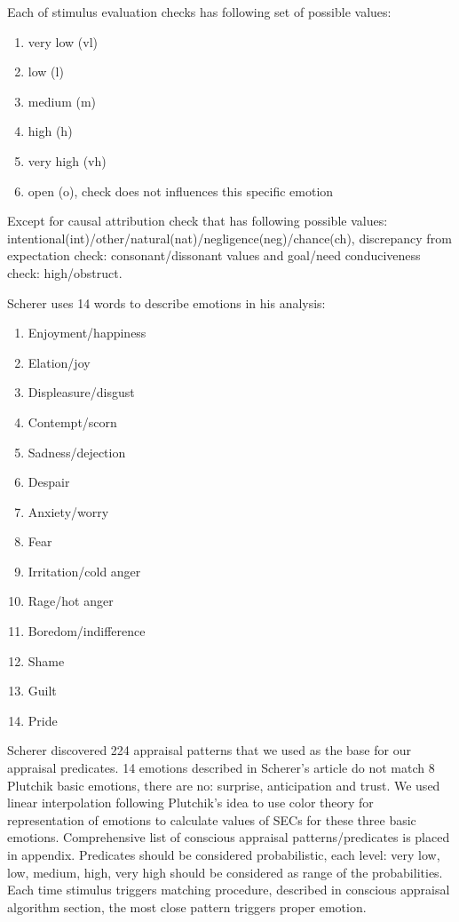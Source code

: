 Each of stimulus evaluation checks has following set of possible values:

\begin{enumerate}
\item  very low (vl)
\item  low (l)
\item  medium (m)
\item  high (h)
\item  very high (vh)
\item  open (o), check does not influences this specific emotion
\end{enumerate}

Except for causal attribution check that has following possible values: intentional(int)/other/natural(nat)/negligence(neg)/chance(ch),  discrepancy from expectation check: consonant/dissonant values and goal/need conduciveness check: high/obstruct.

Scherer uses 14 words to describe emotions in his analysis:

\begin{enumerate}
\item  Enjoyment/happiness
\item  Elation/joy
\item  Displeasure/disgust
\item  Contempt/scorn
\item  Sadness/dejection
\item  Despair
\item  Anxiety/worry
\item  Fear
\item  Irritation/cold anger
\item  Rage/hot anger
\item  Boredom/indifference
\item  Shame
\item  Guilt
\item  Pride
\end{enumerate}

Scherer discovered 224 appraisal patterns that we used as the base for our appraisal predicates. 14 emotions described in Scherer's article do not match 8 Plutchik basic emotions, there are no: surprise, anticipation and trust. We used linear interpolation following Plutchik's idea to use color theory for representation of emotions to calculate values of SECs for these three basic emotions. Comprehensive list of conscious appraisal patterns/predicates is placed in appendix. Predicates should be considered probabilistic, each level: very low, low, medium, high, very high should be considered as range of the probabilities. Each time stimulus triggers matching procedure, described in conscious appraisal algorithm section, the most close pattern triggers proper emotion.

